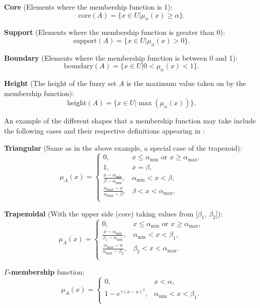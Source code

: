 \textbf{Core} (Elements where the membership function is 1):
\[
	\text{core}(A) = \{x \in U \vert \mu_{\alpha}(x) \geq \alpha\}.
\]

\textbf{Support} (Elements where the membership function is greater than 0):
\[
	\text{support}(A) = \{x \in U \vert \mu_{\alpha}(x) > 0\}.
\]

\textbf{Boundary} (Elements where the membership function is between 0 and 1):
\[
	\text{boundary}(A) = \{x \in U \vert 0 < \mu_{\alpha}(x) < 1\}.
\]

\textbf{Height} (The height of the fuzzy set $A$ is the maximum value taken on by the membership function):
\[
	\text{height}(A) = \{x \in U \vert \max(\mu_{\alpha}(x))\}.
\]

An example of the different shapes that a membership function may take include the following cases and their respective definitions appearing in \cite{sabri2013}:

\textbf{Triangular} (Same as in the above example, a special case of the trapezoid):
\[
	\mu_{A}(x) =
		\begin{cases}
			0, &x \leq \alpha_{\min} \text{ or } x \geq \alpha_{\max},\\
			1, &x = \beta,\\
			\frac{x - \alpha_{\min}}{\beta - \alpha_{\min}}, &\alpha_{\min} < x < \beta,\\
			\frac{\alpha_{\max} - x}{\alpha_{\max} - \beta}, &\beta < x < \alpha_{\max}.\\
		\end{cases}
\]

\textbf{Trapezoidal} (With the upper side (core) taking values from [$\beta_1$, $\beta_2$]):
\[
	\mu_{A}(x) =
		\begin{cases}
			0, &x \leq \alpha_{\min} \text{ or } x \geq \alpha_{\max},\\
			\frac{x - \alpha_{\min}}{\beta_1 - \alpha_{\min}}, &\alpha_{\min} < x < \beta_1,\\
			\frac{\alpha_{\max} - x}{\alpha_{\max} - \beta_2}, &\beta_2 < x < \alpha_{\max}.\\
		\end{cases}
\]

\textbf{$\Gamma$-membership} function:
\[
	\mu_{A}(x) =
		\begin{cases}
			0, &x < \alpha,\\
			1-e^{\gamma(x-a)^2}, &\alpha_{\min} < x < \beta_1.\\
		\end{cases}
\]

